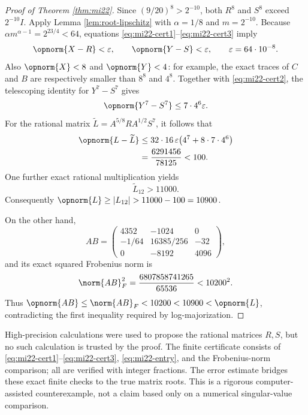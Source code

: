 \begin{proof}[Proof of Theorem \ref{thm:mi22}]
Since $(9/20)^8>2^{-10}$, both $R^8$ and $S^8$ exceed $2^{-10}I$. Apply Lemma \ref{lem:root-lipschitz} with $\alpha=1/8$ and $m=2^{-10}$. Because $\alpha m^{\alpha-1}=2^{23/4}<64$, equations \eqref{eq:mi22-cert1}--\eqref{eq:mi22-cert3} imply
\[
 \opnorm{X-R}<\varepsilon,\qquad \opnorm{Y-S}<\varepsilon,
 \qquad \varepsilon=64\cdot10^{-8}.
\]
Also $\opnorm{X}<8$ and $\opnorm{Y}<4$: for example, the exact traces of $C$ and $B$ are respectively smaller than $8^8$ and $4^8$. Together with \eqref{eq:mi22-cert2}, the telescoping identity for $Y^7-S^7$ gives
\[
 \opnorm{Y^7-S^7}\leq7\cdot4^6\varepsilon.
\]
For the rational matrix $\widetilde L=A^{5/8}RA^{1/2}S^7$, it follows that
\begin{align*}
 \opnorm{L-\widetilde L}
 &\leq32\cdot16\,\varepsilon\bigl(4^7+8\cdot7\cdot4^6\bigr)\\
 &=\frac{6291456}{78125}<100.
\end{align*}
One further exact rational multiplication yields
\begin{equation}\label{eq:mi22-entry}
 \widetilde L_{12}>11000.
\end{equation}
Consequently $\opnorm{L}\geq|L_{12}|>11000-100=10900$.

On the other hand,
\[
 AB=\begin{pmatrix}4352&-1024&0\\-1/64&16385/256&-32\\0&-8192&4096\end{pmatrix},
\]
and its exact squared Frobenius norm is
\[
 \norm{AB}_F^2=\frac{6807858741265}{65536}<10200^2.
\]
Thus $\opnorm{AB}\leq\norm{AB}_F<10200<10900<\opnorm{L}$, contradicting the first inequality required by log-majorization.
\end{proof}

\begin{remark}
High-precision calculations were used to propose the rational matrices $R,S$, but no such calculation is trusted by the proof. The finite certificate consists of \eqref{eq:mi22-cert1}--\eqref{eq:mi22-cert3}, \eqref{eq:mi22-entry}, and the Frobenius-norm comparison; all are verified with integer fractions. The error estimate bridges these exact finite checks to the true matrix roots. This is a rigorous computer-assisted counterexample, not a claim based only on a numerical singular-value comparison.
\end{remark}
